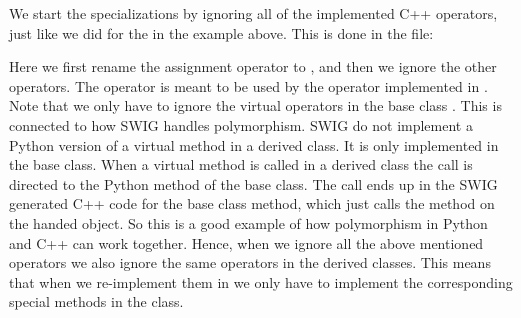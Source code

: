 We start the specializations by ignoring all of the implemented C++ operators, just like we did for the  in the  example above. This is done in the  file:
\begin{c++}
\end{c++}
Here we first rename the assignment operator to , and then we ignore the other operators. The  operator is meant to be used by the  operator implemented in . Note that we only have to ignore the virtual operators in the base class . This is connected to how SWIG handles polymorphism. SWIG do not implement a Python version of a virtual method in a derived class. It is only implemented in the base class. When a virtual method is called in a derived class the call is directed to the Python method of the base class. The call ends up in the SWIG generated C++ code for the base class method, which just calls the method on the handed object. So this is a good example of how polymorphism in Python and C++ can work together. Hence, when we ignore all the above mentioned operators we also ignore the same operators in the derived classes. This means that when we re-implement them in  we only have to implement the corresponding special methods in the  class.\par


